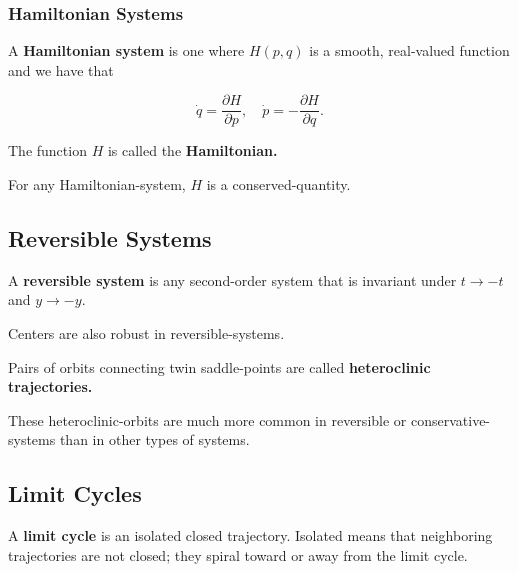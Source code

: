 \documentclass{article}
\begin{document}
\subsubsection{Hamiltonian Systems}

\begin{definition}
A \textbf{Hamiltonian system} is one where $H(p,q)$ is a smooth, real-valued function and we have that

\[ \dot{q} = \frac{\partial H}{\partial p}, \quad \dot{p} = -\frac{\partial H}{\partial q}. \]

The function $H$ is called the \textbf{Hamiltonian.}
\end{definition}

\begin{theorem}
For any \@{Hamiltonian-system}, $H$ is a \@{conserved-quantity}.
\end{theorem}

\subsection{Reversible Systems}

\begin{definition}
A \textbf{reversible system} is any second-order system that is invariant under $t \to -t$ and $y \to -y.$
\end{definition}

Centers are also robust in \@{reversible-systems}.

\begin{definition}
Pairs of orbits connecting twin \@{saddle-points} are called \textbf{heteroclinic trajectories.}
\end{definition}

These \@{heteroclinic-orbits} are much more common in reversible or \@{conservative-systems} than in other types of systems.


\subsection{Limit Cycles}

\begin{definition}
A \textbf{limit cycle} is an isolated \@{closed} \@{trajectory}. Isolated means that \@{neighboring} \@{trajectories} are not \@{closed}; they spiral toward or away from the limit cycle.
\end{definition}
\end{document}
